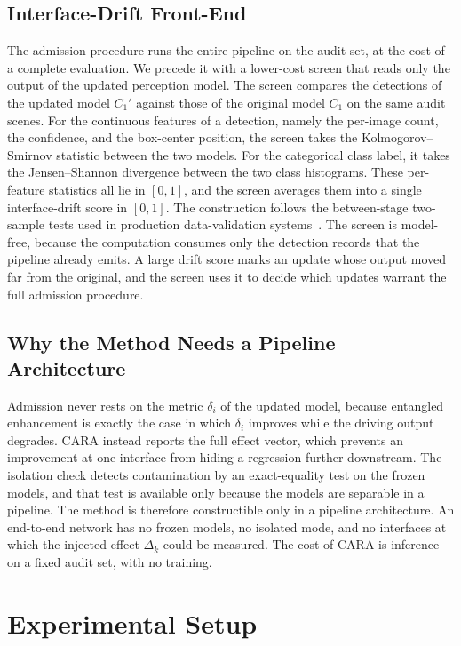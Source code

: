 \documentclass[conference]{IEEEtran}
\begin{document}
\subsection{Interface-Drift Front-End}
\label{sec:cara-frontend}
The admission procedure runs the entire pipeline on the audit set, at the cost of a
complete evaluation. We precede it with a lower-cost screen that reads only the
output of the updated perception model. The screen compares the detections of the
updated model $C_1'$ against those of the original model $C_1$ on the same audit
scenes. For the continuous features of a detection, namely the per-image count, the
confidence, and the box-center position, the screen takes the Kolmogorov--Smirnov
statistic between the two models. For the categorical class label, it takes the
Jensen--Shannon divergence between the two class histograms. These per-feature
statistics all lie in $[0,1]$, and the screen averages them into a single
interface-drift score in $[0,1]$. The construction follows the between-stage
two-sample tests used in production data-validation
systems~\cite{breck2019data}. The screen is model-free, because the computation
consumes only the detection records that the pipeline already emits. A large drift score marks an
update whose output moved far from the original, and the screen uses it to decide
which updates warrant the full admission procedure.

\subsection{Why the Method Needs a Pipeline Architecture}
Admission never rests on the metric $\delta_i$ of the updated model, because
entangled enhancement is exactly the case in which $\delta_i$ improves while the
driving output degrades. CARA instead reports the full effect vector, which prevents an
improvement at one interface from hiding a regression further downstream. The
isolation check detects contamination by an exact-equality test on the frozen
models, and that test is available only because the models are separable in a
pipeline. The method is therefore constructible only in a pipeline architecture.
An end-to-end network has no frozen models, no isolated mode, and no interfaces at
which the injected effect $\Delta_k$ could be measured. The cost of CARA is
inference on a fixed audit set, with no training.

\section{Experimental Setup}
\label{sec:setup}
\end{document}
